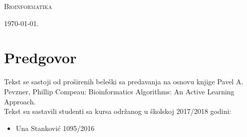 \documentclass[a4paper]{book}
\begin{document}
\begin{titlepage}
	\vspace*{0.4\textheight}
	
	\begin{center}
		{\Huge \textsc{Bioinformatika}}
	\end{center}
	
	\vfill
	
	\begin{center}
		{\Large \today.}
	\end{center}
\end{titlepage}

\blankpage

\frontmatter
\tableofcontents
\blankpage

\chapter*{Predgovor}
Tekst se sastoji od proširenih beleški sa predavanja na osnovu knjige Pavel A. Pevzner, Phillip Compeau: Bioinformatics Algorithms: An Active Learning Approach. \\Tekst su sastavili studenti sa kursa održanog u školskoj 2017/2018 godini: 
\begin{itemize}
	\item Una Stanković 1095/2016
\end{itemize}


\blankpage

\mainmatter


\backmatter
\renewcommand{\bibname}{Literatura}

\begingroup
\raggedright

\endgroup


\end{document}
